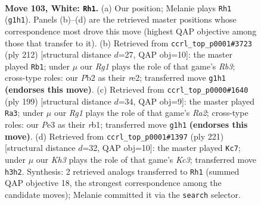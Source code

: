 \documentclass[11pt]{article}
\begin{document}
\clearpage

\begin{figure}[p]\centering
\begin{subfigure}{0.46\textwidth}\centering
\resizebox{\linewidth}{!}{%
\newchessgame
\chessboard[
  setfen={7r/2k5/p7/P1p2p1p/1p3P1P/4P1PK/1P6/6R1 w - - 17 103},
  showmover=false,
  pgfstyle=straightmove, color=movearrow, markmove={g1-h1}
]}
\caption{}
\end{subfigure}\hfill
\begin{subfigure}{0.46\textwidth}\centering
\resizebox{\linewidth}{!}{%
\newchessgame
\chessboard[
  setfen={8/5p2/4p2k/4Pp1p/5P1P/1R4PK/4r3/8 w - - 97 107},
  showmover=false,
  pgfstyle=straightmove, color=movearrow, markmove={b3-b1}
]}
\caption{}
\end{subfigure}
\\[4pt]
\begin{subfigure}{0.46\textwidth}\centering
\resizebox{\linewidth}{!}{%
\newchessgame
\chessboard[
  setfen={8/r4pk1/4p1p1/4P2p/5P1P/6P1/6K1/1R6 b - - 28 100},
  showmover=false,
  pgfstyle=straightmove, color=movearrow, markmove={a7-a3}
]}
\caption{}
\end{subfigure}\hfill
\begin{subfigure}{0.46\textwidth}\centering
\resizebox{\linewidth}{!}{%
\newchessgame
\chessboard[
  setfen={8/8/1pk1K2p/p1p3pP/P1P3P1/8/8/8 b - - 19 111},
  showmover=false,
  pgfstyle=straightmove, color=movearrow, markmove={c6-c7}
]}
\caption{}
\end{subfigure}
\caption{\textbf{Move 103, White: \texttt{Rh1}.} (a) Our position; Melanie plays \texttt{Rh1} (\texttt{g1h1}). Panels (b)--(d) are the retrieved master positions whose correspondence most drove this move (highest QAP objective among those that transfer to it). (b) Retrieved from \texttt{ccrl\_top\_p0001\#3723} (ply 212) [structural distance $d$=27, QAP obj=10]: the master played \texttt{Rb1}; under $\mu$ our \emph{Rg1} plays the role of that game's \emph{Rb3}; cross-type roles: our \emph{P}b2 as their \emph{r}e2; transferred move \texttt{g1h1} \textbf{(endorses this move)}. (c) Retrieved from \texttt{ccrl\_top\_p0000\#1640} (ply 199) [structural distance $d$=34, QAP obj=9]: the master played \texttt{Ra3}; under $\mu$ our \emph{Rg1} plays the role of that game's \emph{Ra2}; cross-type roles: our \emph{P}e3 as their \emph{r}b1; transferred move \texttt{g1h1} \textbf{(endorses this move)}. (d) Retrieved from \texttt{ccrl\_top\_p0001\#1397} (ply 221) [structural distance $d$=32, QAP obj=10]: the master played \texttt{Kc7}; under $\mu$ our \emph{Kh3} plays the role of that game's \emph{Kc3}; transferred move \texttt{h3h2}. Synthesis: 2 retrieved analogs transferred to \texttt{Rh1} (summed QAP objective 18, the strongest correspondence among the candidate moves); Melanie committed it via the \texttt{search} selector.}
\label{fig:thought-m204}
\end{figure}
\end{document}
